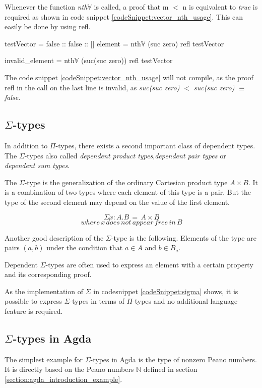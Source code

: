 Whenever the function \emph{nth$\mathbb{V}$} is called, a proof that m $<$ n is equivalent to \emph{true} is required as shown in code snippet \ref{codeSnippet:vector_nth_usage}. This can easily be done by using refl.

\begin{codesnippet}[mathescape=true, caption={Usage of \emph{nth} function in Agda}, label={codeSnippet:vector_nth_usage}]
testVector = false :: false :: []
element = nth$\mathbb{V}$ (suc zero) refl testVector

invalid_element = nth$\mathbb{V}$ (suc(suc zero)) 
                  refl testVector
\end{codesnippet}

The code snippet \ref{codeSnippet:vector_nth_usage} will not compile, as the proof refl in the call on the last line is invalid, as \emph{suc(suc zero) $<$ suc(suc zero) $\equiv$ false}.

\subsection{$\Sigma$-types}
In addition to $\Pi$-types, there exists a second important class of dependent types. 
The $\Sigma$-types also called \emph{dependent product types}\cite{10.1145/2841316},\emph{dependent pair types}\cite{10.1145/2841316} or \emph{dependent sum types}\cite{10.5555/1076265}.

The $\Sigma$-type is the generalization of the ordinary Cartesian product type $A \times B$. 
It is a combination of two types where each element of this type is a pair. 
But the type of the second element may depend on the value of the first element.

$$\Sigma x: A.B \,= \, A \times B$$
$$where \, x \, does \, not \, appear \, free \, in \, B$$

Another good description of the $\Sigma$-type is the following. 
Elements of the type are pairs $(a, b)$ under the condition that $a \in A$ and $b \in B_a$.

Dependent $\Sigma$-types are often used to express an element with a certain property and its corresponding proof.

As the implementation of $\Sigma$ in codesnippet \ref{codeSnippet:sigma} shows, it is possible to express $\Sigma$-types in terms of $\Pi$-types and no additional language feature is required.

\subsection{$\Sigma$-types in Agda}
The simplest example for $\Sigma$-types in Agda is the type of nonzero Peano numbers.
It is directly based on the Peano numbers $\mathbb{N}$ defined in section \ref{section:agda_introduction_example}.

